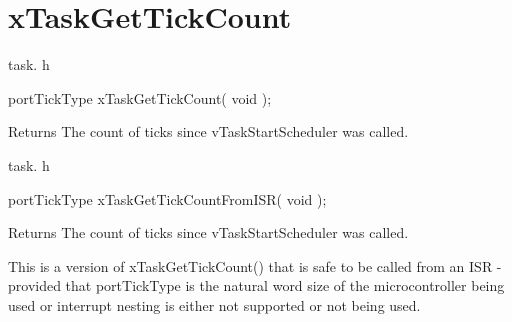 \hypertarget{group__x_task_get_tick_count}{\section{x\-Task\-Get\-Tick\-Count}
\label{group__x_task_get_tick_count}
}
task. h 
\begin{DoxyPre}portTickType xTaskGetTickCount( void );\end{DoxyPre}


\begin{DoxyReturn}{Returns}
The count of ticks since v\-Task\-Start\-Scheduler was called.
\end{DoxyReturn}
task. h 
\begin{DoxyPre}portTickType xTaskGetTickCountFromISR( void );\end{DoxyPre}


\begin{DoxyReturn}{Returns}
The count of ticks since v\-Task\-Start\-Scheduler was called.
\end{DoxyReturn}
This is a version of x\-Task\-Get\-Tick\-Count() that is safe to be called from an I\-S\-R -\/ provided that port\-Tick\-Type is the natural word size of the microcontroller being used or interrupt nesting is either not supported or not being used. 